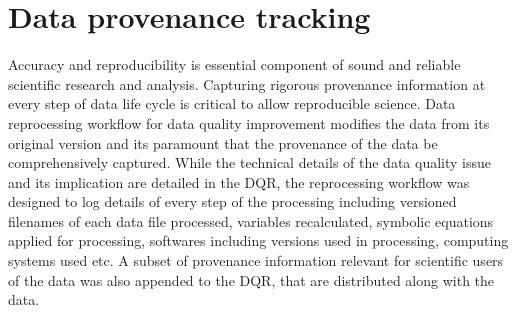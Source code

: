 \section{Data provenance tracking}
Accuracy and reproducibility is essential component of sound and
reliable scientific research and analysis. Capturing rigorous provenance
information at every step of data life cycle is critical to allow
reproducible science. Data reprocessing workflow for data quality
improvement modifies the data from its original version and its
paramount that the provenance of the data be comprehensively captured.
While the technical details of the data quality issue and its
implication are detailed in the DQR, the reprocessing workflow was
designed to log details of every step of the processing including
versioned filenames of each data file processed, variables recalculated,
symbolic equations applied for processing, softwares including versions
used in processing, computing systems used etc. A subset of provenance
information relevant for scientific users of the data was also appended
to the DQR, that are distributed along with the data. 

